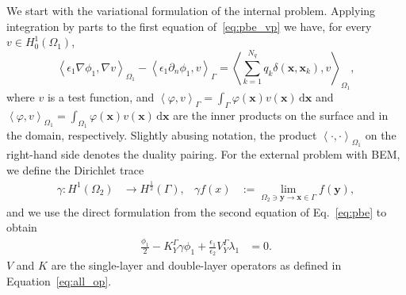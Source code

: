 We start with the variational formulation of the internal problem. Applying integration by parts to the first equation of~\eqref{eq:pbe_vp} we have, for every $v \in H_0^1(\Omega_1)$,
% 
\begin{equation}
\label{eq:fem}
 \left\langle \epsilon_1 \nabla \phi_1, \nabla v \right\rangle_{\Omega_1}  -  \left\langle  \epsilon_1\partial_n \phi_1, v \right\rangle_\Gamma =  \left\langle \sum_{k=1}^{N_q} q_k\delta(\mathbf{x},\mathbf{x}_k),  v\right\rangle_{\Omega_1},
\end{equation}
%
where $v$ is a test function, and $\left\langle\varphi,v\right\rangle_\Gamma = \int_\Gamma \varphi(\mathbf{x})v(\mathbf{x})\,\mathrm{d}\mathbf{x}$ and $\left\langle\varphi,v\right\rangle_{\Omega_1} = \int_{\Omega_1} \varphi(\mathbf{x})v(\mathbf{x})\,\mathrm{d}\mathbf{x}$ are the inner products on the surface and in the domain, respectively. Slightly abusing notation, the product $\left\langle \cdot, \cdot \right\rangle_{\Omega_1}$ on the right-hand side denotes the duality pairing.
For the external problem with BEM, we define the Dirichlet trace~\cite{MR2361676} 
\begin{align*}
\gamma:  H^1(\Omega_2) &\rightarrow H^{\frac{1}{2}}(\Gamma), & \gamma f(x) & := \lim_{\Omega_2 \ni \mathbf{y} \rightarrow \mathbf{x} \in \Gamma}  f(\mathbf{y}),
\end{align*}
and we use the direct formulation from the second equation of Eq.~\eqref{eq:pbe} to obtain
\begin{align*}
\tfrac{\phi_1}{2} - K_{Y}^{\Gamma}\gamma \phi_1 + \tfrac{\epsilon_1}{\epsilon_2}V_{Y}^{\Gamma}  \lambda_1 & = 0.
\end{align*}
$V$ and $K$ are the single-layer and double-layer operators as defined in Equation~\eqref{eq:all_op}.
%
%
%
%

